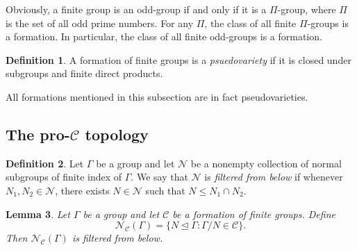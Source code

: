 \documentclass[10pt,a4paper]{amsart}
\newtheorem{theorem}{Theorem}[section]
\newtheorem{lemma}[theorem]{Lemma}
\theoremstyle{definition}
\newtheorem{definition}[theorem]{Definition}
\theoremstyle{definition}
\numberwithin{equation}{section}
\begin{document}
Obviously, a finite group is an odd-group if and only if it is a $\Pi$-group, where $\Pi$ is the set of all odd prime numbers. For any $\Pi$, the class of all finite $\Pi$-groups is a formation. In particular, the class of all finite odd-groups is a formation.

\begin{definition} A formation of finite groups is a {\em psuedovariety} if it is closed under subgroups and finite direct products.
\end{definition}

All formations mentioned in this subsection are in fact pseudovarieties.

\subsection{The pro-$\mathcal{C}$ topology}

\begin{definition} Let $\Gamma$ be a group and let $\mathcal{N}$ be a nonempty collection of normal subgroups of finite index of $\Gamma$. We say that $\mathcal{N}$ is {\em filtered from below} if whenever $N_1, N_2\in\mathcal{N}$, there exists $N\in\mathcal{N}$ such that $N\leq N_1\cap N_2$.
\end{definition}

\begin{lemma}\label{lem:filteredbelow} Let $\Gamma$ be a group and let $\mathcal{C}$ be a formation of finite groups. Define
$$ \mathcal{N}_{\mathcal{C}}(\Gamma)=\{N\unlhd \Gamma\colon \Gamma/N\in\mathcal{C}\}. $$
Then $\mathcal{N}_{\mathcal{C}}(\Gamma)$ is filtered from below.
\end{lemma}
\end{document}
